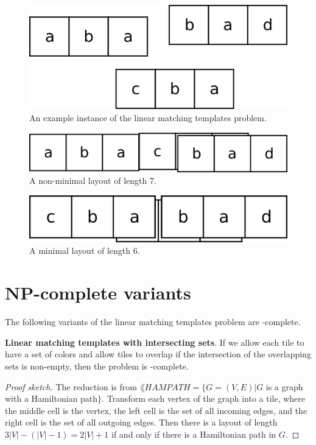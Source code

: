 \documentclass{lposter}
\theoremstyle{definition} \newtheorem*{definition}{Definition}
\begin{document}
\begin{poster}
\begin{figure}
  \caption{An example instance of the linear matching templates problem.}
  \includegraphics{example-instance}
\end{figure}

\begin{figure}
  \caption{A non-minimal layout of length 7.}
  \includegraphics{non-minimal}
\end{figure}

\begin{figure}
  \caption{A minimal layout of length 6.}
  \includegraphics{minimal}
\end{figure}

\section{NP-complete variants}

The following variants of the linear matching templates problem are
\NP-complete.

{\bf Linear matching templates with intersecting sets}. If we allow each tile
to have a set of colors and allow tiles to overlap if the intersection of the
overlapping sets is non-empty, then the problem is \NP-complete.

\begin{proof}[Proof sketch]
  The reduction is from $\lang{HAMPATH} = \{G=(V, E)|G$ is a graph with a
  Hamiltonian path$\}$. Transform each vertex of the graph into a tile, where
  the middle cell is the vertex, the left cell is the set of all incoming
  edges, and the right cell is the set of all outgoing edges. Then there is a
  layout of length $3|V| - (|V| - 1) = 2|V| + 1$ if and only if there is a
  Hamiltonian path in $G$.
\end{proof}


\end{poster}
\end{document}
